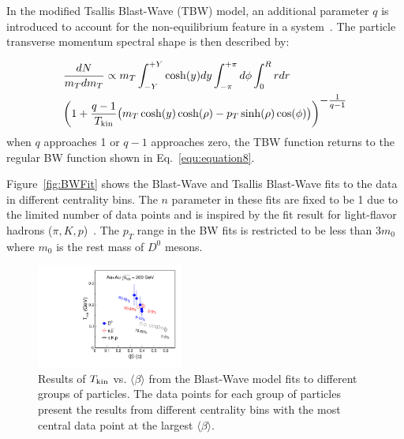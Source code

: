\documentclass[%
 reprint,	
 amsmath,amssymb,
 aps,
 prc,
]{revtex4-1}
\begin{document}
In the modified Tsallis Blast-Wave (TBW) model, an additional parameter $q$ is introduced to account for the non-equilibrium feature in a system~\cite{Tang:2008ud}. The particle transverse momentum spectral shape is then described by: 

\begin{equation}
  \begin{aligned}
    & \frac{dN}{m_{T}dm_{T}} \propto m_{T}\int_{-Y}^{+Y}\cosh(y)dy \int_{-\pi}^{+\pi} d\phi \int_0^R rdr \\
    & \bigg(1+\frac{q-1}{T_{\rm kin}}\big(m_{T}\cosh(y)\cosh(\rho)-p_{T}\sinh(\rho)\cos(\phi)\big)\bigg)^{\textstyle -\frac{1}{q-1}}
  \end{aligned}
\label{equ:equation10}
\end{equation}
when $q$ approaches 1 or $q-1$ approaches zero, the TBW function returns to the regular BW function shown in Eq.~\ref{equ:equation8}.


Figure~\ref{fig:BWFit} shows the Blast-Wave and Tsallis Blast-Wave fits to the data in different centrality bins. The $n$ parameter in these fits are fixed to be 1 due to the limited number of data points and is inspired by the fit result for light-flavor hadrons ($\pi,K,p$)~\cite{Tang:2008ud}. The $p_{T}$ range in the BW fits is restricted to be less than 3$m_{0}$ where $m_{0}$ is the rest mass of $D^0$ mesons.

\begin{figure}
\centering
\includegraphics[width=0.43\textwidth]{fig/TvsBeta.pdf}
\caption{Results of $T_{\rm kin}$ vs. $\langle\beta\rangle$ from the Blast-Wave model fits to different groups of particles. The data points for each group of particles present the results from different centrality bins with the most central data point at the largest $\langle\beta\rangle$.}
\label{fig:BWFitSummary} 
\end{figure}
\end{document}
